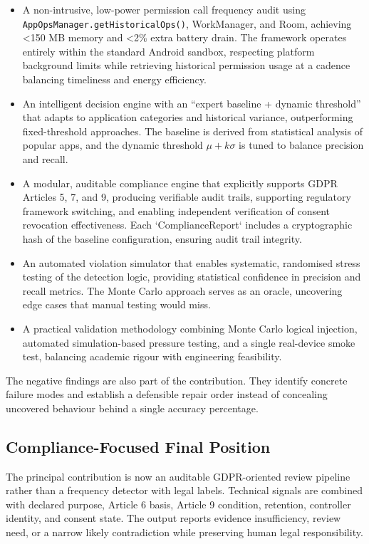 \begin{itemize}
    \item A non-intrusive, low-power permission call frequency audit using \texttt{AppOpsManager.getHistoricalOps()}, WorkManager, and Room, achieving <150 MB memory and <2\% extra battery drain. The framework operates entirely within the standard Android sandbox, respecting platform background limits while retrieving historical permission usage at a cadence balancing timeliness and energy efficiency.
    \item An intelligent decision engine with an ``expert baseline + dynamic threshold'' that adapts to application categories and historical variance, outperforming fixed-threshold approaches. The baseline is derived from statistical analysis of popular apps, and the dynamic threshold $\mu + k\sigma$ is tuned to balance precision and recall.
    \item A modular, auditable compliance engine that explicitly supports GDPR Articles 5, 7, and 9, producing verifiable audit trails, supporting regulatory framework switching, and enabling independent verification of consent revocation effectiveness. Each `ComplianceReport` includes a cryptographic hash of the baseline configuration, ensuring audit trail integrity.
    \item An automated violation simulator that enables systematic, randomised stress testing of the detection logic, providing statistical confidence in precision and recall metrics. The Monte Carlo approach serves as an oracle, uncovering edge cases that manual testing would miss.
    \item A practical validation methodology combining Monte Carlo logical injection, automated simulation-based pressure testing, and a single real-device smoke test, balancing academic rigour with engineering feasibility.
\end{itemize}

The negative findings are also part of the contribution. They identify concrete failure modes and establish a defensible repair order instead of concealing uncovered behaviour behind a single accuracy percentage.

\subsection{Compliance-Focused Final Position}

The principal contribution is now an auditable GDPR-oriented review pipeline rather than a frequency detector with legal labels. Technical signals are combined with declared purpose, Article 6 basis, Article 9 condition, retention, controller identity, and consent state. The output reports evidence insufficiency, review need, or a narrow likely contradiction while preserving human legal responsibility.

